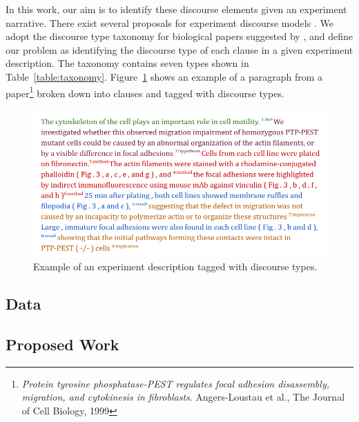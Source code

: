 In this work, our aim is to identify these
discourse elements given an experiment narrative. There exist several proposals for experiment 
discourse models \cite{liakata2010zones,nawaz2010evaluating,mizuta2004annotation,nwogu1997medical}. 
We adopt the discourse type
taxonomy 
for biological papers suggested by \cite{de2012verb}, and define our problem
as identifying the discourse type of each clause in a given experiment
description.
The taxonomy contains seven types shown in Table~\ref{table:taxonomy}.
Figure~\ref{fig:example_parse} shows an example of a paragraph from a
paper\footnote{\textit{Protein tyrosine phosphatase-PEST 
regulates focal adhesion disassembly, migration, and cytokinesis in
fibroblasts}. Angers-Loustau et al., The Journal of Cell Biology, 1999} broken
down into clauses and
tagged with discourse types.
\begin{figure}
  \begin{center}
  \includegraphics[width=5in]{figures/example_text.png}
  \caption{Example of an experiment description tagged with discourse types.}
  \label{fig:example_parse}
  \end{center}
 \end{figure}

\subsection{Data}
\subsection{Proposed Work}